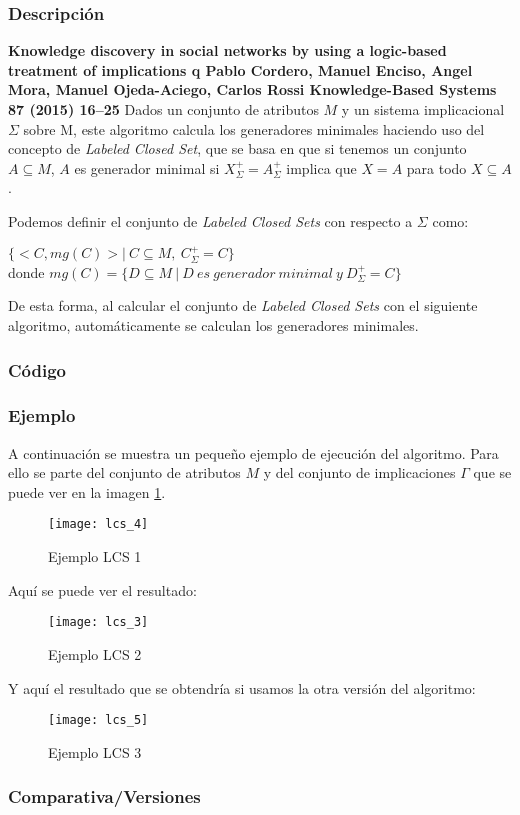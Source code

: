 \subsubsection{Descripci\'on} 

\textbf{Knowledge discovery in social networks by using a logic-based treatment of implications q
Pablo Cordero, Manuel Enciso, Angel Mora, Manuel Ojeda-Aciego, Carlos Rossi
Knowledge-Based Systems 87 (2015) 16–25}
Dados un conjunto de atributos \(M\) y un sistema implicacional \(\Sigma\) sobre M, este algoritmo calcula los generadores minimales haciendo uso del concepto de \textit{Labeled Closed Set}, que se basa en que si tenemos un conjunto \(A \subseteq M\), \(A\) es generador minimal si \(X^+_{\Sigma} = A^+_{\Sigma}\) implica que \(X = A\) para todo  \(X \subseteq A\). 

Podemos definir el conjunto de \textit{Labeled Closed Sets} con respecto a \(\Sigma\) como:
\begin{center}
    \(\{<C,mg(C)> | \ C \subseteq M, \ C^+_{\Sigma} = C \}\)\\
    donde \(mg(C) = \{D \subseteq M \ | \ D \ es \ generador \ minimal \ y \ D^+_{\Sigma} = C \}\)
\end{center}

De esta forma, al calcular el conjunto de \textit{Labeled Closed Sets} con el siguiente algoritmo, autom\'aticamente se calculan los generadores minimales.

\subsubsection{C\'odigo} 

\subsubsection{Ejemplo} 
A continuaci\'on se muestra un peque\~no ejemplo de ejecuci\'on del algoritmo. Para ello se parte del conjunto de atributos \(M\) y del conjunto de implicaciones \(\Gamma\) que se puede ver en la imagen \ref{fig:lcs_4}.
\begin{figure}[H]
    \centering
    \texttt{[image: lcs\_4]}
    \caption{Ejemplo LCS 1}
    \label{fig:lcs_4}
\end{figure} 
Aqu\'i se puede ver el resultado:
\begin{figure}[H]
    \centering
    \texttt{[image: lcs\_3]}
    \caption{Ejemplo LCS 2}
    \label{fig:lcs_3}
\end{figure}
Y aqu\'i el resultado que se obtendr\'ia si usamos la otra versi\'on del algoritmo:
\begin{figure}[H]
    \centering
    \texttt{[image: lcs\_5]}
    \caption{Ejemplo LCS 3}
    \label{fig:lcs_5}
\end{figure}
\subsubsection{Comparativa/Versiones} 